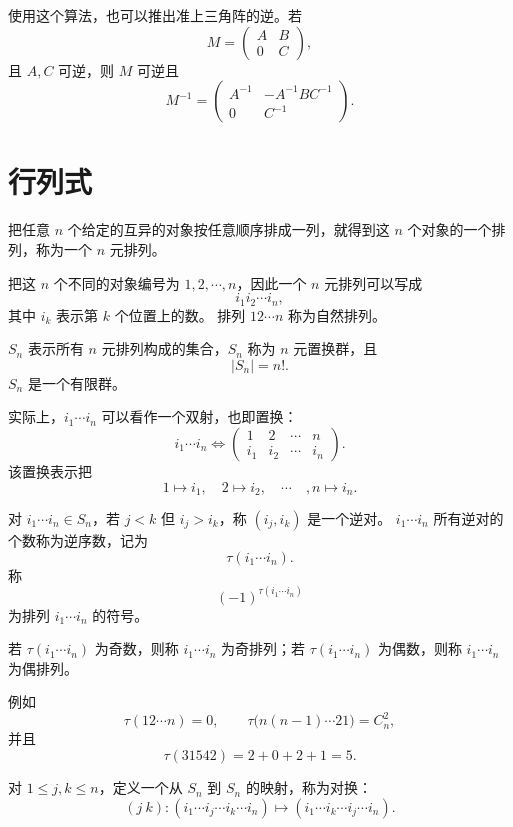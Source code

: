 使用这个算法，也可以推出准上三角阵的逆。若
\[
M=\begin{pmatrix}
	A&B\\
	0&C
\end{pmatrix},
\]
且 $A,C$ 可逆，则 $M$ 可逆且
\[
M^{-1}=\begin{pmatrix}
	A^{-1}&-A^{-1}BC^{-1}\\
	0&C^{-1}
\end{pmatrix}.
\]
\section{行列式}

\begin{definition}\label{3.6.1}
	把任意 $n$ 个给定的互异的对象按任意顺序排成一列，就得到这 $n$ 个对象的一个排列，称为一个 $n$ 元排列。
	
	把这 $n$ 个不同的对象编号为 $1,2,\cdots,n$，因此一个 $n$ 元排列可以写成
	\[
	i_1i_2\cdots i_n,
	\]
	其中 $i_k$ 表示第 $k$ 个位置上的数。
	排列 $12\cdots n$ 称为自然排列。
	
	$S_n$ 表示所有 $n$ 元排列构成的集合，$S_n$ 称为 $n$ 元置换群，且
	\[
	|S_n|=n!.
	\]
	$S_n$ 是一个有限群。
\end{definition}
实际上，$i_1\cdots i_n$ 可以看作一个双射，也即置换：
\[
i_1\cdots i_n
\Longleftrightarrow
\begin{pmatrix}
	1&2&\cdots&n\\
	i_1&i_2&\cdots&i_n
\end{pmatrix}.
\]
该置换表示把
\[
1\mapsto i_1,
\quad
2\mapsto i_2,
\quad\cdots\quad,
n\mapsto i_n.
\]
\begin{definition}\label{3.6.2}
	对 $i_1\cdots i_n\in S_n$，若 $j<k$ 但 $i_j>i_k$，称 $(i_j,i_k)$ 是一个逆对。
	$i_1\cdots i_n$ 所有逆对的个数称为逆序数，记为
	\[
	\tau(i_1\cdots i_n).
	\]
	称
	\[
	(-1)^{\tau(i_1\cdots i_n)}
	\]
	为排列 $i_1\cdots i_n$ 的符号。
	
	若 $\tau(i_1\cdots i_n)$ 为奇数，则称 $i_1\cdots i_n$ 为奇排列；若 $\tau(i_1\cdots i_n)$ 为偶数，则称 $i_1\cdots i_n$ 为偶排列。
	
\end{definition}
例如
\[
\tau(12\cdots n)=0,
\qquad
\tau\bigl(n(n-1)\cdots 21\bigr)=C_n^2,
\]
并且
\[
\tau(31542)=2+0+2+1=5.
\]
\begin{definition}\label{3.6.3}
	对 $1\leq j,k\leq n$，定义一个从 $S_n$ 到 $S_n$ 的映射，称为对换：
	\[
	(j\ k):
	(i_1\cdots i_j\cdots i_k\cdots i_n)
	\longmapsto
	(i_1\cdots i_k\cdots i_j\cdots i_n).
	\]
\end{definition}

